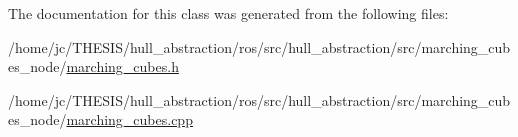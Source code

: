 The documentation for this class was generated from the following files\+:\begin{DoxyCompactItemize}
\item 
/home/jc/\+T\+H\+E\+S\+I\+S/hull\+\_\+abstraction/ros/src/hull\+\_\+abstraction/src/marching\+\_\+cubes\+\_\+node/\hyperlink{marching__cubes_8h}{marching\+\_\+cubes.\+h}\item 
/home/jc/\+T\+H\+E\+S\+I\+S/hull\+\_\+abstraction/ros/src/hull\+\_\+abstraction/src/marching\+\_\+cubes\+\_\+node/\hyperlink{marching__cubes_8cpp}{marching\+\_\+cubes.\+cpp}\end{DoxyCompactItemize}
